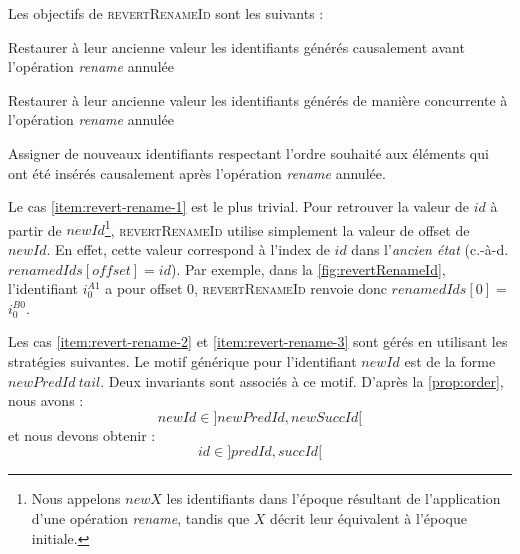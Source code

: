 \documentclass[12pt]{thesul}
\newcommand{\ie}{c.-à-d. }
\newcommand{\trm}[1]{\mathit{#1}}
\newcommand{\id}[3]{$\trm{#1}^{\trm{#2}}_{\trm{#3}}$}
\begin{document}
Les objectifs de \textsc{revertRenameId} sont les suivants :
\begin{enumerate*}[label=(\roman*)]
  \item \label{item:revert-rename-1}
    Restaurer à leur ancienne valeur les identifiants générés causalement avant l'opération \emph{rename} annulée
  \item \label{item:revert-rename-2}
    Restaurer à leur ancienne valeur les identifiants générés de manière concurrente à l'opération \emph{rename} annulée
  \item \label{item:revert-rename-3}
    Assigner de nouveaux identifiants respectant l'ordre souhaité aux éléments qui ont été insérés causalement après l'opération \emph{rename} annulée.
\end{enumerate*}

Le cas \ref{item:revert-rename-1} est le plus trivial.
Pour retrouver la valeur de $\trm{id}$ à partir de $\trm{newId}$\footnote{Nous appelons $\trm{newX}$ les identifiants dans l'époque résultant de l'application d'une opération \emph{rename}, tandis que $\trm{X}$ décrit leur équivalent à l'époque initiale.}, \textsc{revertRenameId} utilise simplement la valeur de offset de $\trm{newId}$.
En effet, cette valeur correspond à l'index de $\trm{id}$ dans l'\emph{ancien état} (\ie $\trm{renamedIds[offset]} = \trm{id}$).
Par exemple, dans la \autoref{fig:revertRenameId}, l'identifiant \id{i}{A1}{0} a pour offset 0, \textsc{revertRenameId} renvoie donc $\trm{renamedIds[0]} =$ \id{i}{B0}{0}.

Les cas \ref{item:revert-rename-2} et \ref{item:revert-rename-3} sont gérés en utilisant les stratégies suivantes.
Le motif générique pour l'identifiant $\trm{newId}$ est de la forme $\trm{newPredId~tail}$.
Deux invariants sont associés à ce motif.
D'après la \autoref{prop:order}, nous avons :
\[\trm{newId} \in ]\trm{newPredId}, \trm{newSuccId}[\]
et nous devons obtenir :
\[\trm{id} \in ]\trm{predId}, \trm{succId}[\]
\end{document}
